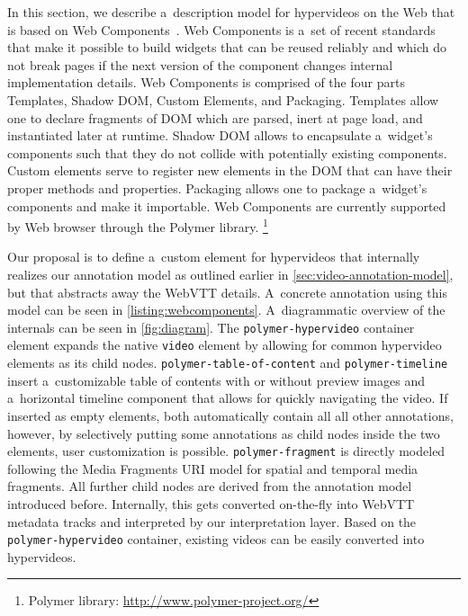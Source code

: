 \documentclass[runningheads,a4paper]{llncs}
\newcommand{\inlinelistingsize}{\fontsize{8pt}{11pt}}
\let\oldurl\url
\renewcommand{\url}[1]{\inlinelistingsize\oldurl{#1}}
\begin{document}
In this section, we describe a~description model for hypervideos on the Web
that is based on Web Components~\cite{cooney2013webcomponents}.
Web Components is a~set of recent standards that
make it possible to build widgets that can be reused reliably
and which do not break pages if the next version of the component
changes internal implementation details.
Web Components is comprised of the four parts
Templates, Shadow DOM, Custom Elements, and Packaging.
Templates allow one to declare fragments of DOM which are parsed,
inert at page load, and instantiated later at runtime.
Shadow DOM allows to encapsulate a~widget's components
such that they do not collide with potentially existing components.
Custom elements serve to register new elements in the DOM
that can have their proper methods and properties.
Packaging allows one to package a~widget's components and make it importable.
Web Components are currently supported by Web browser through the Polymer library.%
\footnote{Polymer library: \url{http://www.polymer-project.org/}}

Our proposal is to define a~custom element for hypervideos
that internally realizes our annotation model
as outlined earlier in \autoref{sec:video-annotation-model},
but that abstracts away the WebVTT details.
A~concrete annotation using this model can be seen in 
\autoref{listing:webcomponents}.
A~diagrammatic overview of the internals can be seen in \autoref{fig:diagram}.
The \texttt{polymer-hypervideo} container element expands the native 
\texttt{video} element by allowing for common hypervideo elements as its child nodes.
\texttt{polymer-table-of-content} and \texttt{polymer-timeline}
insert a~customizable table of contents with or without preview images
and a~horizontal timeline component that allows for quickly navigating the video.
If inserted as empty elements, both automatically contain all all other annotations,
however, by selectively putting some annotations as child nodes inside the two elements,
user customization is possible.
\texttt{polymer-fragment} is directly modeled following
the Media Fragments URI model for spatial and temporal media fragments.
All further child nodes are derived from the annotation model introduced before.
Internally, this gets converted on-the-fly into WebVTT metadata tracks
and interpreted by our interpretation layer.
Based on the \texttt{polymer-hypervideo} container,
existing videos can be easily converted into hypervideos.
\end{document}
